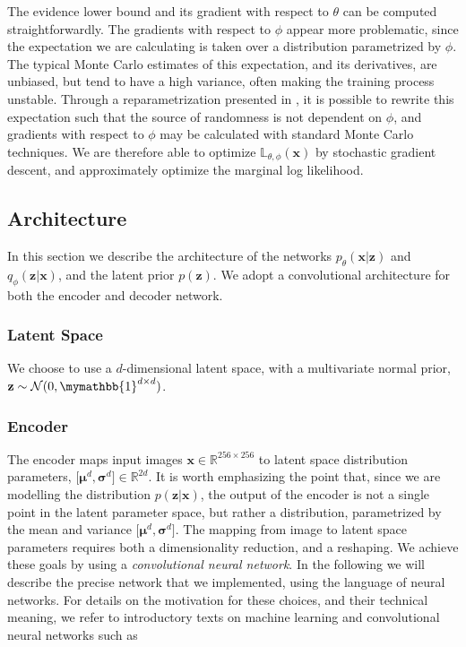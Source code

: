 \documentclass[fleqn,usenatbib]{mnras}
\begin{document}
The evidence lower bound and its gradient with respect to $\theta$ can be computed straightforwardly. The gradients with respect to $\phi$ appear more problematic, since the expectation we are calculating is taken over a distribution parametrized by $\phi$. The typical Monte Carlo estimates of this expectation, and its derivatives, are unbiased, but tend to have a high variance, often making the training process unstable. Through a reparametrization presented in \cite{kingma/welling:2013}, it is possible to rewrite this expectation such that the source of randomness is not dependent on $\phi$, and gradients with respect to $\phi$ may be calculated with standard Monte Carlo techniques. We are therefore able to optimize $\mathbb{L}_{\theta, \phi}(\mathbf x)$ by stochastic gradient descent, and approximately optimize the marginal log likelihood. 

\subsection{Architecture}
\label{sec:architecture} 

In this section we describe the architecture of the networks $p_\theta(\mathbf x | \mathbf z)$ and $q_\phi(\mathbf z | \mathbf x)$, and the latent prior $p(\mathbf z)$. We adopt a convolutional architecture for both the encoder and decoder network. 

\subsubsection{Latent Space} We choose to use a $d$-dimensional latent space, with a multivariate normal prior, $\mathbf z \sim \mathcal{N}(0, \mymathbb{1}^{d \times d})$.

\subsubsection{Encoder} The encoder maps input images $\mathbf x \in \mathbb{R}^{256\times 256}$ to latent space distribution parameters, $\mathbf [\bm \mu^d, \bm  \sigma^d] \in \mathbb{R}^{2d}$. It is worth emphasizing the point that, since we are modelling the distribution $p(\mathbf z | \mathbf x)$, the output of the encoder is not a single point in the latent parameter space, but rather a distribution, parametrized by the mean and variance $\mathbf [\bm \mu^d, \bm  \sigma^d]$. The mapping from image to latent space parameters requires both a dimensionality reduction, and a reshaping. We achieve these goals by using a \emph{convolutional neural network}. In the following we will describe the precise network that we implemented, using the language of neural networks. For details on the motivation for these choices, and their technical meaning, we refer to introductory texts on machine learning and convolutional neural networks such as \cite{goodfellow/etal:2016}
\end{document}

